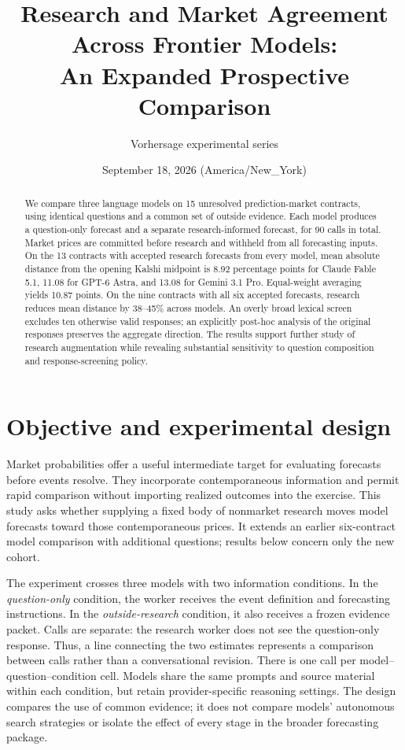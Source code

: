 \documentclass[11pt]{article}
\title{Research and Market Agreement Across Frontier Models:\\An Expanded Prospective Comparison}
\author{Vorhersage experimental series}
\date{September 18, 2026 (America/New\_York)}
\begin{document}
\maketitle
\begin{abstract}
We compare three language models on 15 unresolved prediction-market contracts,
using identical questions and a common set of outside evidence. Each model
produces a question-only forecast and a separate research-informed forecast,
for 90 calls in total. Market prices are committed before research and withheld
from all forecasting inputs. On the 13 contracts with accepted research forecasts
from every model, mean absolute distance from the opening Kalshi midpoint is
8.92 percentage points for Claude Fable 5.1, 11.08 for GPT-6 Astra, and 13.08
for Gemini 3.1 Pro. Equal-weight averaging yields 10.87 points. On the nine
contracts with all six accepted forecasts, research reduces mean distance by
38--45\% across models. An overly broad lexical screen excludes ten otherwise
valid responses; an explicitly post-hoc analysis of the original responses
preserves the aggregate direction. The results support further study of research
augmentation while revealing substantial sensitivity to question composition
and response-screening policy.
\end{abstract}

\section{Objective and experimental design}
Market probabilities offer a useful intermediate target for evaluating forecasts
before events resolve. They incorporate contemporaneous information and permit
rapid comparison without importing realized outcomes into the exercise. This
study asks whether supplying a fixed body of nonmarket research moves model
forecasts toward those contemporaneous prices. It extends an earlier six-contract
model comparison with additional questions; results below concern only the new
cohort.

The experiment crosses three models with two information conditions. In the
\emph{question-only} condition, the worker receives the event definition and
forecasting instructions. In the \emph{outside-research} condition, it also receives
a frozen evidence packet. Calls are separate: the research worker does not see
the question-only response. Thus, a line connecting the two estimates represents
a comparison between calls rather than a conversational revision. There is one
call per model--question--condition cell. Models share the same prompts and
source material within each condition, but retain provider-specific reasoning
settings. The design compares the use of common evidence; it does not compare
models' autonomous search strategies or isolate the effect of every stage in
the broader forecasting package.
\end{document}
